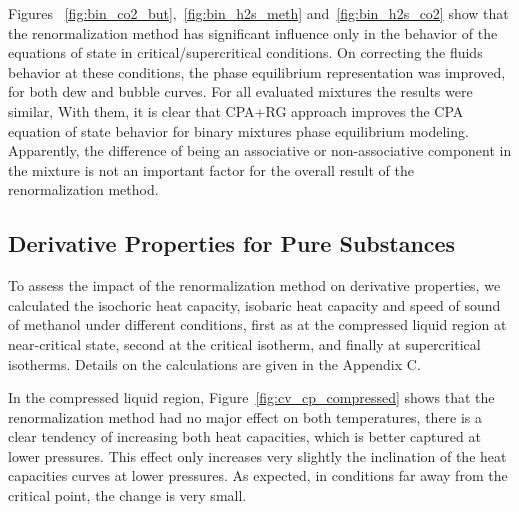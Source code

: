 \documentclass[preprint,12pt,3p]{elsarticle}
\begin{document}
Figures ~\ref{fig:bin_co2_but},~\ref{fig:bin_h2s_meth} and~\ref{fig:bin_h2s_co2} show that the renormalization method has significant influence only in the behavior of the equations of state in critical/supercritical conditions.
On correcting the fluids behavior at these conditions, the phase equilibrium representation was improved, for both dew and bubble curves.
For all evaluated mixtures the results were similar, With them, it is clear that CPA+RG approach improves the CPA equation of state behavior for binary mixtures phase equilibrium modeling.
Apparently, the difference of being an associative or non-associative component in the mixture is not an important factor for the overall result of the renormalization method.

\subsection{Derivative Properties for Pure Substances}

To assess the impact of the renormalization method on derivative properties, we calculated the isochoric heat capacity, isobaric heat capacity and speed of sound of methanol under different conditions, first as at the compressed liquid region at near-critical state, second at the critical isotherm, and finally at supercritical isotherms.
Details on the calculations are given in the Appendix C.

In the compressed liquid region, Figure~\ref{fig:cv_cp_compressed} shows that the renormalization method had no major effect on both temperatures, there is a clear tendency of increasing both heat capacities, which is better captured at lower pressures.
This effect only increases very slightly the inclination of the heat capacities curves at lower pressures.
As expected, in conditions far away from the critical point, the change is very small.
\end{document}
